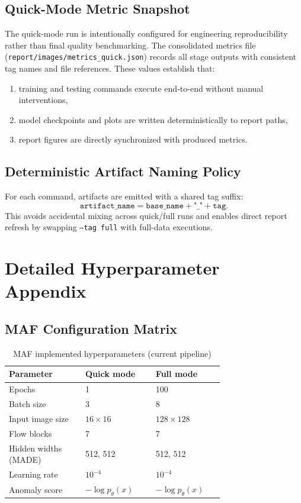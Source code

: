 \documentclass[conference]{IEEEtran}
\begin{document}
\subsection{Quick-Mode Metric Snapshot}
The quick-mode run is intentionally configured for engineering reproducibility rather than final quality benchmarking. The consolidated metrics file (\texttt{report/images/metrics\_quick.json}) records all stage outputs with consistent tag names and file references. These values establish that:
\begin{enumerate}
\item training and testing commands execute end-to-end without manual interventions,
\item model checkpoints and plots are written deterministically to report paths,
\item report figures are directly synchronized with produced metrics.
\end{enumerate}

\subsection{Deterministic Artifact Naming Policy}
For each command, artifacts are emitted with a shared tag suffix:
\begin{equation}
\texttt{artifact\_name} = \texttt{base\_name} + \texttt{"\_"} + \texttt{tag}.
\end{equation}
This avoids accidental mixing across quick/full runs and enables direct report refresh by swapping \texttt{--tag full} with full-data executions.

\section{Detailed Hyperparameter Appendix}
\subsection{MAF Configuration Matrix}
\begin{table}[!t]
\centering
\caption{MAF implemented hyperparameters (current pipeline)}
\begin{tabular}{|p{0.28\linewidth}|p{0.24\linewidth}|p{0.20\linewidth}|}
\hline
\textbf{Parameter} & \textbf{Quick mode} & \textbf{Full mode} \\
\hline
Epochs & 1 & 100 \\
\hline
Batch size & 3 & 8 \\
\hline
Input image size & $16 \times 16$ & $128 \times 128$ \\
\hline
Flow blocks & 7 & 7 \\
\hline
Hidden widths (MADE) & 512, 512 & 512, 512 \\
\hline
Learning rate & $10^{-4}$ & $10^{-4}$ \\
\hline
Anomaly score & $-\log p_\theta(x)$ & $-\log p_\theta(x)$ \\
\hline
\end{tabular}
\end{table}
\end{document}
